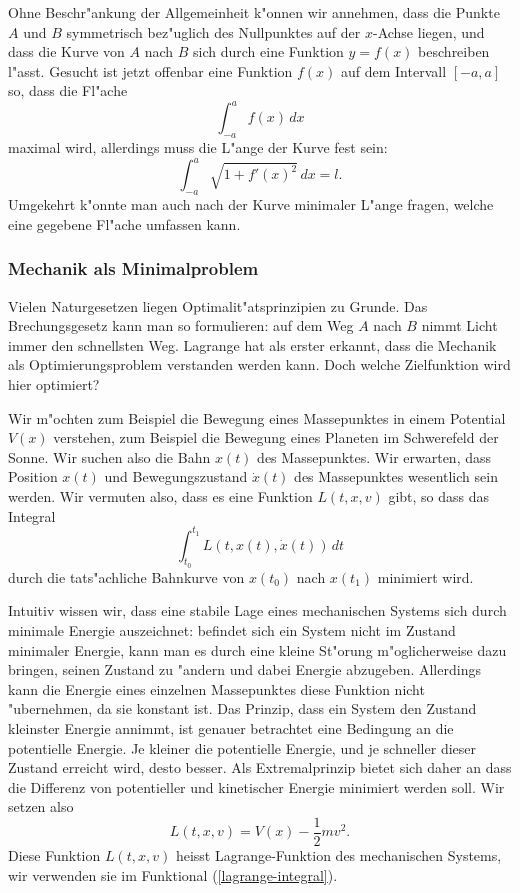 Ohne Beschr"ankung der Allgemeinheit k"onnen wir annehmen, dass die
Punkte $A$ und $B$ symmetrisch bez"uglich des Nullpunktes auf der
$x$-Achse liegen, und dass die Kurve von $A$ nach $B$ sich durch eine
Funktion $y=f(x)$ beschreiben l"asst. Gesucht ist jetzt offenbar eine
Funktion $f(x)$ auf dem Intervall $[-a,a]$ so, dass die Fl"ache
\[
\int_{-a}^af(x)\,dx
\]
maximal wird, allerdings muss die L"ange der Kurve fest sein:
\[
\int_{-a}^{a} \sqrt{1+f'(x)^2}\,dx=l.
\]
Umgekehrt k"onnte man auch nach der Kurve minimaler L"ange
fragen, welche eine gegebene Fl"ache umfassen kann.

\subsubsection{Mechanik als Minimalproblem}
Vielen Naturgesetzen liegen Optimalit"atsprinzipien zu Grunde.
Das Brechungsgesetz kann man so formulieren: auf dem Weg $A$ 
nach $B$ nimmt Licht immer den schnellsten Weg.
Lagrange hat als erster erkannt, dass die Mechanik als Optimierungsproblem
verstanden werden kann. Doch welche Zielfunktion wird hier optimiert?

Wir m"ochten zum Beispiel die Bewegung eines Massepunktes in einem
Potential $V(x)$ verstehen, zum Beispiel die Bewegung eines Planeten
im Schwerefeld der Sonne.
Wir suchen also die Bahn $x(t)$ des Massepunktes.
Wir erwarten, dass Position $x(t)$ und Bewegungszustand $\dot x(t)$
des Massepunktes wesentlich sein werden.
Wir vermuten also, dass es eine Funktion $L(t,x,v)$ gibt,
so dass das Integral
\begin{equation}
\int_{t_0}^{t_1} L(t, x(t), \dot x(t))\,dt
\label{lagrange-integral}
\end{equation}
durch die tats"achliche Bahnkurve von $x(t_0)$ nach $x(t_1)$
minimiert wird.

Intuitiv wissen wir, dass eine stabile Lage eines mechanischen Systems
sich durch minimale Energie auszeichnet: befindet sich ein System nicht
im Zustand minimaler Energie, kann man es durch eine kleine 
St"orung m"oglicherweise dazu bringen, seinen Zustand zu "andern
und dabei Energie abzugeben. Allerdings kann die Energie eines
einzelnen Massepunktes diese Funktion nicht "ubernehmen, da sie
konstant ist. Das Prinzip, dass ein System den Zustand kleinster
Energie annimmt, ist genauer betrachtet eine Bedingung an die potentielle
Energie. Je kleiner die potentielle Energie, und je schneller dieser
Zustand erreicht wird, desto besser. Als Extremalprinzip bietet
sich daher an dass die Differenz von potentieller und kinetischer
Energie minimiert werden soll. Wir setzen also
\begin{equation}
L(t,x,v)=V(x)-\frac12mv^2.
\label{lagrange-funktion}
\end{equation}
Diese Funktion $L(t,x,v)$ heisst Lagrange-Funktion des mechanischen
Systems, wir
verwenden sie im Funktional (\ref{lagrange-integral}).

